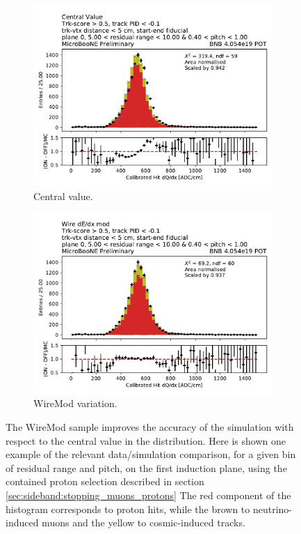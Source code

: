 \begin{figure}[H] 
\begin{center}
    \begin{subfigure}[b]{0.4\textwidth}
    \centering
    \includegraphics[width=1.00\textwidth]{detsys/calorimetry_dqdx/bnb_nu_mod_0005_rr_0010_004_pitch_010_noleg.pdf}
    \caption{\label{fig:syst:dedx_1d:cv} Central value.}
    \end{subfigure}
    \begin{subfigure}[b]{0.4\textwidth}
    \centering
    \includegraphics[width=1.00\textwidth]{detsys/calorimetry_dqdx/bnb_nu_wire_dedx_mod_0005_rr_0010_004_pitch_010_noleg.pdf}
    \caption{\label{fig:syst:dedx_1d:wiremod_dedx} WireMod \dedx variation.}
    \end{subfigure}
\caption{\label{fig:syst:dedx_1d}The WireMod \dedx sample improves the accuracy of the simulation with respect to the central value in the \dqdx distribution. 
Here is shown one example of the relevant data/simulation comparison, for a given bin of residual range and pitch, on the first induction plane, using the contained proton selection described in section \ref{sec:sideband:stopping_muons_protons}
The red component of the histogram corresponds to proton hits, while the brown to neutrino-induced muons and the yellow to cosmic-induced tracks.}
\end{center}
\end{figure}

